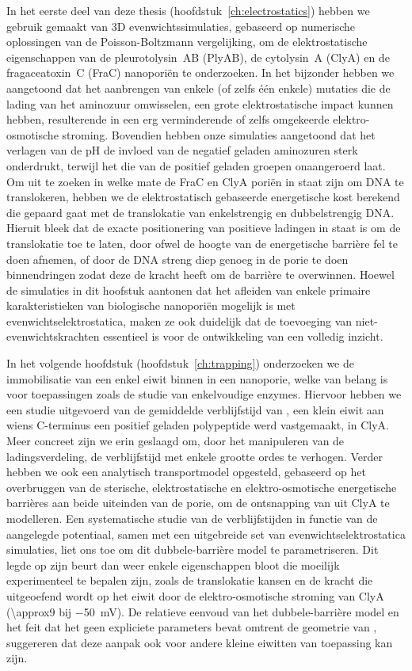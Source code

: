 In het eerste deel van deze thesis (hoofdstuk~\ref{ch:electrostatics}) hebben we gebruik gemaakt van 3D
evenwichtssimulaties, gebaseerd op numerische oplossingen van de Poisson-Boltzmann vergelijking, om de
elektrostatische eigenschappen van de pleurotolysin~AB (PlyAB), de cytolysin~A (ClyA) en de fragaceatoxin~C
(FraC) nanopori\"{e}n te onderzoeken. In het bijzonder hebben we aangetoond dat het aanbrengen van enkele (of
zelfs \'{e}\'{e}n enkele) mutaties die de lading van het aminozuur omwisselen, een grote elektrostatische
impact kunnen hebben, resulterende in een erg verminderende of zelfs omgekeerde elektro-osmotische stroming.
Bovendien hebben onze simulaties aangetoond dat het verlagen van de pH de invloed van de negatief geladen
aminozuren sterk onderdrukt, terwijl het die van de positief geladen groepen onaangeroerd laat. Om uit te
zoeken in welke mate de FraC en ClyA pori\"{e}n in staat zijn om DNA te translokeren, hebben we de
elektrostatisch gebaseerde energetische kost berekend die gepaard gaat met de translokatie van enkelstrengig
en dubbelstrengig DNA. Hieruit bleek dat de exacte positionering van positieve ladingen in staat is om de
translokatie toe te laten, door ofwel de hoogte van de energetische barri\`{e}re fel te doen afnemen, of door
de DNA streng diep genoeg in de porie te doen binnendringen zodat deze de kracht heeft om de barri\`{e}re te
overwinnen. Hoewel de simulaties in dit hoofstuk aantonen dat het afleiden van enkele primaire
karakteristieken van biologische nanopori\"{e}n mogelijk is met evenwichtselektrostatica, maken ze ook
duidelijk dat de toevoeging van niet-evenwichtskrachten essentieel is voor de ontwikkeling van een volledig
inzicht.

In het volgende hoofdstuk (hoofdstuk~\ref{ch:trapping}) onderzoeken we de immobilisatie van een enkel eiwit
binnen in een nanoporie, welke van belang is voor toepassingen zoals de studie van enkelvoudige enzymes.
Hiervoor hebben we een studie uitgevoerd van de gemiddelde verblijfstijd van \DHFRt{}, een klein eiwit aan
wiens C-terminus een positief geladen polypeptide werd vastgemaakt, in ClyA. Meer concreet zijn we erin
geslaagd om, door het manipuleren van de ladingsverdeling, de verblijfstijd met enkele grootte ordes te
verhogen. Verder hebben we ook een analytisch transportmodel opgesteld, gebaseerd op het overbruggen van de
sterische, elektrostatische en elektro-osmotische energetische barri\`{e}res aan beide uiteinden van de porie,
om de ontsnapping van \DHFRt{} uit ClyA te modelleren. Een systematische studie van de verblijfstijden in
functie van de aangelegde potentiaal, samen met een uitgebreide set van evenwichtselektrostatica simulaties,
liet ons toe om dit dubbele-barri\`{e}re model te parametriseren. Dit legde op zijn beurt dan weer enkele
eigenschappen bloot die moeilijk experimenteel te bepalen zijn, zoals de translokatie kansen en de kracht die
uitgeoefend wordt op het eiwit door de elektro-osmotische stroming van ClyA (\SI{\approx9}{\pN} bij
\SI{-50}{\mV}). De relatieve eenvoud van het dubbele-barri\`{e}re model en het feit dat het geen expliciete
parameters bevat omtrent de geometrie van \DHFRt{}, suggereren dat deze aanpak ook voor andere kleine eiwitten
van toepassing kan zijn.

